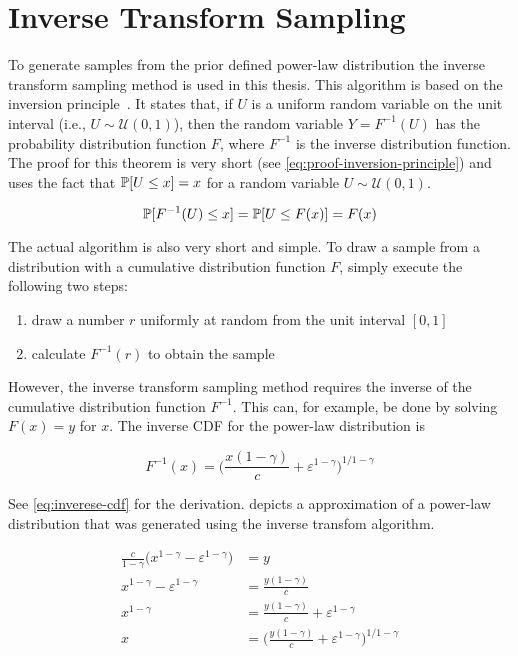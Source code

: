 \section{Inverse Transform Sampling}
\label{sec:inverse-transform-sampling}

To generate samples from the prior defined power-law distribution the inverse transform sampling method is used in this thesis.
This algorithm is based on the inversion principle~\cite{Devroye1986}.
It states that, if \(U\) is a uniform random variable on the unit interval (i.e., \(U \sim \mathcal{U}(0,1)\)), then the random variable \(Y = F^{-1}(U)\) has the probability distribution function \(F\), where \(F^{-1}\) is the inverse distribution function.
The proof for this theorem is very short (see \cref{eq:proof-inversion-principle}) and uses the fact that \(\mathbb{P}[{U \leq x}] = x\) for a random variable \(U \sim \mathcal{U}(0,1)\).

\begin{equation}
    \mathbb{P}[{F^{-1}(U) \leq x}] = \mathbb{P}[{U \leq F(x)}] = F(x)
    \label{eq:proof-inversion-principle}
\end{equation}

The actual algorithm is also very short and simple.
To draw a sample from a distribution with a cumulative distribution function \(F\), simply execute the following two steps:

\begin{enumerate}
    \item draw a number \(r\) uniformly at random from the unit interval \([0, 1]\)
    \item calculate \(F^{-1}(r)\) to obtain the sample
\end{enumerate}

However, the inverse transform sampling method requires the inverse of the cumulative distribution function \(F^{-1}\).
This can, for example, be done by solving \(F(x) = y\) for \(x\).
The inverse CDF for the power-law distribution is

\begin{equation}
    F^{-1}(x) = \Big( \frac{x(1-\gamma)}{c} + \varepsilon^{1-\gamma} \Big)^{1/1-\gamma}
\end{equation}

See \cref{eq:inverese-cdf} for the derivation.
 depicts a approximation of a power-law distribution that was generated using the inverse transfom algorithm.

\begin{align}
	\frac{c}{1-\gamma} \Big( x^{1 - \gamma} - \varepsilon^{1 - \gamma} \Big) & = y \\
    x^{1-\gamma} - \varepsilon^{1-\gamma} & = \frac{y(1-\gamma)}{c} \\
    x^{1-\gamma} & = \frac{y(1-\gamma)}{c} + \varepsilon^{1-\gamma} \\
    x & = \Big( \frac{y(1-\gamma)}{c} + \varepsilon^{1-\gamma} \Big)^{1/1-\gamma}
\label{eq:inverese-cdf}
\end{align}

